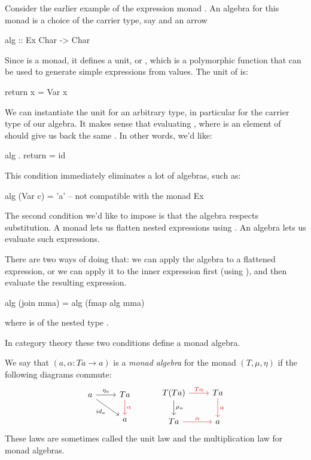 \documentclass[DaoFP]{subfiles}
\begin{document}
Consider the earlier example of the expression monad . An algebra for this monad is a choice of the carrier type, say  and an arrow
\begin{haskell}
alg :: Ex Char -> Char
\end{haskell}
Since  is a monad, it defines a unit, or , which is a polymorphic function that can be used to generate simple expressions from values. The unit of  is:
\begin{haskell}
return x = Var x
\end{haskell}
We can instantiate the unit for an arbitrary type, in particular for the carrier type of our algebra. It makes sense that evaluating , where  is an element of  should give us back the same . In other words, we'd like:
\begin{haskell}
 alg . return = id
\end{haskell}
This condition immediately eliminates a lot of algebras, such as:
\begin{haskell}
alg (Var c) = 'a' -- not compatible with the monad Ex
\end{haskell}

The second condition we'd like to impose is that the algebra respects substitution. A monad lets us flatten nested expressions using . An algebra lets us evaluate such expressions. 

There are two ways of doing that: we can apply the algebra to a flattened expression, or we can apply it to the inner expression first (using ), and then evaluate the resulting expression. 
\begin{haskell}
 alg (join mma) = alg (fmap alg mma)
\end{haskell}
where  is of the nested type .

In category theory these two conditions define a monad algebra. 

We say that $(a, \alpha \colon T a \to a)$ is a \emph{monad algebra} for the monad $(T, \mu, \eta)$ if the following diagrams commute:
\[
 \begin{tikzcd}
 a
 \arrow[r, "\eta_a"]
 \arrow[dr, "id_a"']
 & T a
 \arrow[d, red, "\alpha"]
 \\
 & a
 \end{tikzcd}
  \hspace{30pt}
 \begin{tikzcd}
T(T a) 
\arrow[r, red, "T \alpha "]
\arrow[d, "\mu_a"]
&T a
\arrow[d, red, "\alpha"]
\\
T a
\arrow[r, red, "\alpha"]
& a
 \end{tikzcd}
\]
These laws are sometimes called the unit law and the multiplication law for monad algebras.
\end{document}
